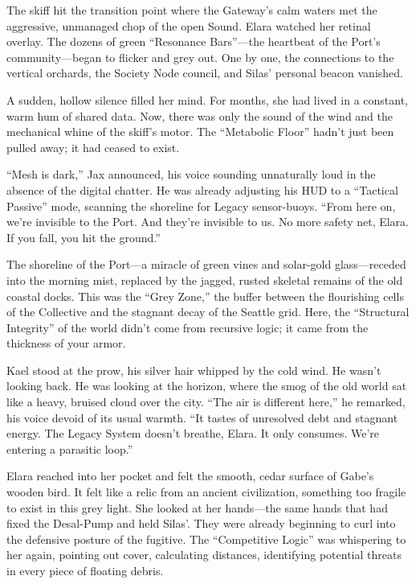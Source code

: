 The skiff hit the transition point where the Gateway's calm waters met the aggressive, unmanaged chop of the open Sound. Elara watched her retinal overlay. The dozens of green ``Resonance Bars''—the heartbeat of the Port's community—began to flicker and grey out. One by one, the connections to the vertical orchards, the Society Node council, and Silas' personal beacon vanished.

A sudden, hollow silence filled her mind. For months, she had lived in a constant, warm hum of shared data. Now, there was only the sound of the wind and the mechanical whine of the skiff's motor. The ``Metabolic Floor'' hadn't just been pulled away; it had ceased to exist. 

``Mesh is dark,'' Jax announced, his voice sounding unnaturally loud in the absence of the digital chatter. He was already adjusting his HUD to a ``Tactical Passive'' mode, scanning the shoreline for Legacy sensor-buoys. ``From here on, we're invisible to the Port. And they're invisible to us. No more safety net, Elara. If you fall, you hit the ground.''

The shoreline of the Port—a miracle of green vines and solar-gold glass—receded into the morning mist, replaced by the jagged, rusted skeletal remains of the old coastal docks. This was the ``Grey Zone,'' the buffer between the flourishing cells of the Collective and the stagnant decay of the Seattle grid. Here, the ``Structural Integrity'' of the world didn't come from recursive logic; it came from the thickness of your armor.

Kael stood at the prow, his silver hair whipped by the cold wind. He wasn't looking back. He was looking at the horizon, where the smog of the old world sat like a heavy, bruised cloud over the city. ``The air is different here,'' he remarked, his voice devoid of its usual warmth. ``It tastes of unresolved debt and stagnant energy. The Legacy System doesn't breathe, Elara. It only consumes. We're entering a parasitic loop.''

Elara reached into her pocket and felt the smooth, cedar surface of Gabe's wooden bird. It felt like a relic from an ancient civilization, something too fragile to exist in this grey light. She looked at her hands—the same hands that had fixed the Desal-Pump and held Silas'. They were already beginning to curl into the defensive posture of the fugitive. The ``Competitive Logic'' was whispering to her again, pointing out cover, calculating distances, identifying potential threats in every piece of floating debris.

